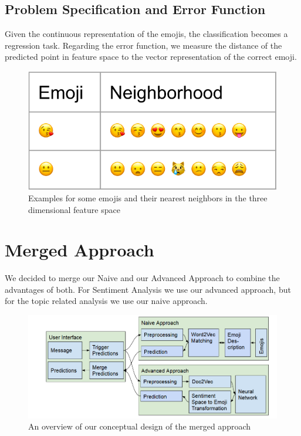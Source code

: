 \documentclass{article}
\begin{document}
\subsection{Problem Specification and Error Function}
Given the continuous representation of the emojis, the classification becomes a regression task. Regarding the error function, we measure the distance of the predicted point in feature space to the vector representation of 
the correct emoji.
\begin{figure}[h!]
\centering
\includegraphics[scale=0.5]{images/closestEmojis}
\caption{Examples for some emojis and their nearest neighbors in the three dimensional feature space}
\end{figure}


\section{Merged Approach}
We decided to merge our Naive and our Advanced Approach to combine the advantages of both. For Sentiment Analysis we use our advanced approach, but for the topic related analysis we use our naive approach. 

\begin{figure}[h!]
\centering
\includegraphics[scale=0.45]{images/mergedApproachOutline.png}
\caption{An overview of our conceptual design of the merged approach}
\label{fig:merged_approach}
\end{figure}
\end{document}

